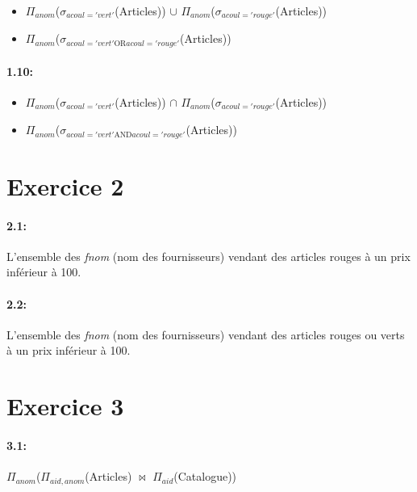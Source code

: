 \documentclass[a4paper,10pt]{article}
\begin{document}
\begin{itemize}
	\item	$\Pi_{anom}$($\sigma_{acoul = 'vert' }$(Articles)) $\cup$ $\Pi_{anom}$($\sigma_{acoul = 'rouge' }$(Articles))
\par
	\item $\Pi_{anom}$($\sigma_{acoul = 'vert'  \mbox{OR} acoul= 'rouge' }$(Articles))
\end{itemize}

\paragraph{1.10:}

\begin{itemize}
	\item	$\Pi_{anom}$($\sigma_{acoul = 'vert' }$(Articles)) $\cap$ $\Pi_{anom}$($\sigma_{acoul = 'rouge' }$(Articles))
\par
	\item $\Pi_{anom}$($\sigma_{acoul = 'vert'  \mbox{AND} acoul= 'rouge' }$(Articles))
\end{itemize}

\section{Exercice 2}

\paragraph{2.1:}
L'ensemble des \emph{fnom} (nom des fournisseurs) vendant des articles rouges \`{a} un prix inf\'{e}rieur \`{a} 100.

\paragraph{2.2:}

L'ensemble des \emph{fnom} (nom des fournisseurs) vendant des articles rouges ou verts \`{a} un prix inf\'{e}rieur \`{a} 100.

\section{Exercice 3}

\paragraph{3.1:}
$\Pi_{anom}$($\Pi_{aid,anom}$(Articles) $\bowtie$ $\Pi_{aid}$(Catalogue))
\end{document}
